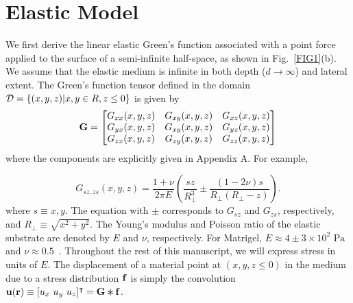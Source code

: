 \documentclass[aps,prl,reprint,twocolumn,groupedaddress,showpacs]{revtex4}
\def\f{{\bf f}}
\def\r{{\bf r}}
\def\u{{\bf u}}
\def\F{{\bf F}}
\def\F{{\bf F}}
\newcommand{\Conv}{\mathop{\scalebox{1.5}{\raisebox{-0.2ex}{$\ast$}}}}%
\begin{document}
\section{Elastic Model}

We first derive the linear elastic Green's function associated with a
point force applied to the surface of a semi-infinite half-space, as
shown in Fig.~\ref{FIG1}(b). We assume that the elastic medium is
infinite in both depth ($d\to \infty$) and lateral extent. The Green's
function tensor defined in the domain ${\cal D}=\left\{(x,y,z)|x,y\in
R,z\leq0\right\}$ is given by
\begin{equation}
{\bf G} = \left[ \begin{matrix} G_{xx}(x,y,z) & G_{xy}(x,y,z) & G_{xz}(x,y,z) \\
	G_{yx}(x,y,z) & G_{xy}(x,y,z) & G_{yz}(x,y,z) \\
	G_{zx}(x,y,z) & G_{zy}(x,y,z) & G_{zz}(x,y,z) 
 \end{matrix} \right]
\end{equation}
where the components are explicitly given in 
Appendix A. For example, 

\begin{equation}
G_{sz, zs}(x,y,z) =
\frac{1+\nu}{2\pi E}\left(\frac{sz}{R_{\perp}^{3}}\pm\frac{(1-2\nu)s}{R_{\perp}
(R_{\perp}-z)}\right).
\end{equation}
%
where $s\equiv x,y$. The equation with $\pm$ corresponds to $G_{sz}$
and $G_{zs}$, respectively, and $R_{\perp} \equiv \sqrt{x^{2}
  +y^{2}}$. The Young's modulus and Poisson ratio of the elastic
substrate are denoted by $E$ and $\nu$, respectively.  For Matrigel,
$E\approx4\pm3\times10^2\textrm{ Pa}$ and
$\nu\approx0.5$~\cite{SOOFIA2009}. Throughout the rest of this
manuscript, we will express stress in units of $E$.  The displacement
of a material point at $(x,y,z\leq 0)$ in the medium due to a stress
distribution ${\bf f}$ is simply the convolution $\u(\r) \equiv [u_x
  \ u_y\ u_z]^\intercal = {\bf G}\Conv\f$.
%
\end{document}
